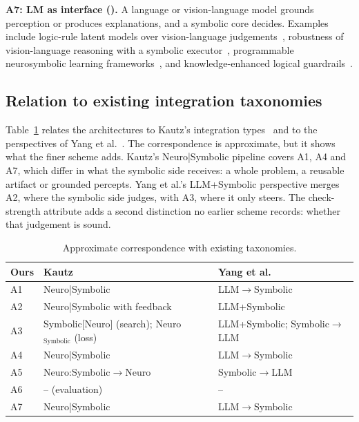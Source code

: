 \textbf{A7: LM as interface ().} A language or vision-language model grounds perception or produces explanations, and a symbolic core decides. Examples include logic-rule latent models over vision-language judgements~\cite{he2026unveiling}, robustness of vision-language reasoning with a symbolic executor~\cite{chen2026vlms}, programmable neurosymbolic learning frameworks~\cite{naik2025dolphin}, and knowledge-enhanced logical guardrails~\cite{kang2025r2}.

\subsection{Relation to existing integration taxonomies}
\label{sec:taxonomy-relations}
Table~\ref{tab:taxmap} relates the architectures to Kautz's integration types~\cite{kautz2022third} and to the perspectives of Yang et al.~\cite{yang2025neuro}. The correspondence is approximate, but it shows what the finer scheme adds. Kautz's Neuro|Symbolic pipeline covers A1, A4 and A7, which differ in what the symbolic side receives: a whole problem, a reusable artifact or grounded percepts. Yang et al.'s LLM+Symbolic perspective merges A2, where the symbolic side judges, with A3, where it only steers. The check-strength attribute adds a second distinction no earlier scheme records: whether that judgement is sound.

\begin{table}[t]
\centering
\caption{Approximate correspondence with existing taxonomies.}
\label{tab:taxmap}
\footnotesize
\begin{tabularx}{\columnwidth}{@{}l X X@{}}
\toprule
Ours & Kautz~\cite{kautz2022third} & Yang et al.~\cite{yang2025neuro} \\
\midrule
A1 & Neuro|Symbolic & LLM$\rightarrow$Symbolic \\
A2 & Neuro|Symbolic with feedback & LLM+Symbolic \\
A3 & Symbolic[Neuro] (search); Neuro$_\text{Symbolic}$ (loss) & LLM+Symbolic; Symbolic$\rightarrow$LLM \\
A4 & Neuro|Symbolic & LLM$\rightarrow$Symbolic \\
A5 & Neuro:Symbolic$\rightarrow$Neuro & Symbolic$\rightarrow$LLM \\
A6 & -- (evaluation) & -- \\
A7 & Neuro|Symbolic & LLM$\rightarrow$Symbolic \\
\bottomrule
\end{tabularx}
\end{table}

